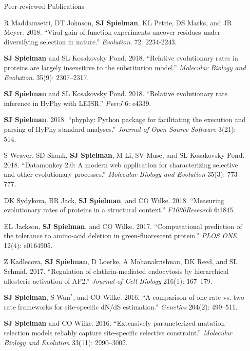 \documentclass{resume} %
\begin{document}
\begin{rSection}{Peer-reviewed Publications}
\begin{etaremune}[leftmargin=1.5em]
\item R Maddamsetti, DT Johnson, \textbf{SJ Spielman}, KL Petrie, DS Marks, and JR Meyer. 2018. ``Viral gain-of-function experiments uncover residues under diversifying selection in nature.'' \emph{Evolution}. 72: 2234-2243.

\item \textbf{SJ Spielman} and SL Kosakovsky Pond. 2018. ``Relative evolutionary rates in proteins are largely insensitive to the substitution model.'' \emph{Molecular Biology and Evolution}. 35(9): 2307–2317.

\item \textbf{SJ Spielman} and SL Kosakovsky Pond. 2018. ``Relative evolutionary rate inference in HyPhy with LEISR.'' \emph{PeerJ} 6: e4339.

\item \textbf{SJ Spielman}. 2018. ``phyphy: Python package for facilitating the execution and parsing of HyPhy standard analyses.''  \emph{Journal of Open Source Software} 3(21): 514.

\item S Weaver, SD Shank, \textbf{SJ Spielman}, M Li, SV Muse, and SL Kosakovsky Pond. 2018. ``Datamonkey 2.0: A modern web application for characterizing selective and other evolutionary processes.'' \emph{Molecular Biology and Evolution} 35(3): 773-777.

\item DK Sydykova, BR Jack, \textbf{SJ Spielman}, and CO Wilke. 2018. ``Measuring evolutionary rates of proteins in a structural context.'' \emph{F1000Research} 6:1845.

\item EL Jackson, \textbf{SJ Spielman}, and CO Wilke. 2017. ``Computational prediction of the tolerance to amino-acid deletion in green-fluorescent protein.'' \emph{PLOS ONE} 12(4): e0164905.

\item Z Kadlecova, \textbf{SJ Spielman}, D Loerke, A Mohanakrishnan, DK Reed, and SL Schmid. 2017. ``Regulation of clathrin-mediated endocytosis by hierarchical allosteric activation of AP2.'' \emph{Journal of Cell Biology} 216(1): 167--179.

\item \textbf{SJ Spielman}, S Wan$^\ast$, and CO Wilke. 2016. ``A comparison of one-rate vs. two-rate frameworks for site-specific dN/dS estimation.'' \emph{Genetics} 204(2): 499--511.

\item \textbf{SJ Spielman} and CO Wilke. 2016. ``Extensively parameterized mutation--selection models reliably capture site-specific selective constraint.'' \emph{Molecular Biology and Evolution} 33(11): 2990--3002.


\end{etaremune}
\end{rSection}
\end{document}
